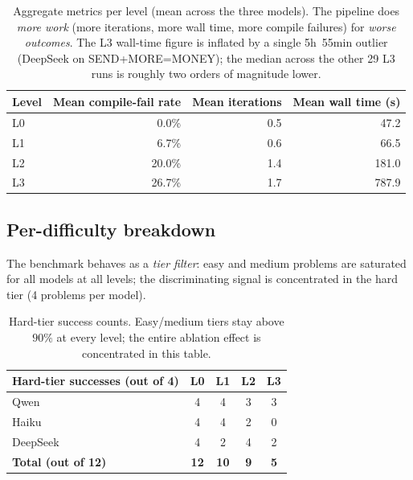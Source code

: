 \documentclass[11pt,a4paper]{article}
\begin{document}
\begin{table}[H]
\centering
\small
\begin{tabular}{@{}lrrr@{}}
\toprule
Level & Mean compile-fail rate & Mean iterations & Mean wall time (s) \\
\midrule
L0 & 0.0\%  & 0.5 & 47.2  \\
L1 & 6.7\%  & 0.6 & 66.5  \\
L2 & 20.0\% & 1.4 & 181.0 \\
L3 & 26.7\% & 1.7 & 787.9 \\
\bottomrule
\end{tabular}
\caption{Aggregate metrics per level (mean across the three models). The
pipeline does \emph{more work} (more iterations, more wall time, more
compile failures) for \emph{worse outcomes}. The L3 wall-time figure is
inflated by a single 5h~55min outlier (DeepSeek on SEND+MORE=MONEY); the
median across the other 29 L3 runs is roughly two orders of magnitude lower.}
\end{table}

\subsection{Per-difficulty breakdown}
The benchmark behaves as a \emph{tier filter}: easy and medium problems are
saturated for all models at all levels; the discriminating signal is
concentrated in the hard tier (4 problems per model).

\begin{table}[H]
\centering
\small
\begin{tabular}{@{}lcccc@{}}
\toprule
Hard-tier successes (out of 4) & L0 & L1 & L2 & L3 \\
\midrule
Qwen      & 4 & 4 & 3 & 3 \\
Haiku     & 4 & 4 & 2 & 0 \\
DeepSeek  & 4 & 2 & 4 & 2 \\
\midrule
\textbf{Total (out of 12)} & \textbf{12} & \textbf{10} & \textbf{9} & \textbf{5} \\
\bottomrule
\end{tabular}
\caption{Hard-tier success counts. Easy/medium tiers stay above $90\%$ at
every level; the entire ablation effect is concentrated in this table.}
\end{table}
\end{document}
